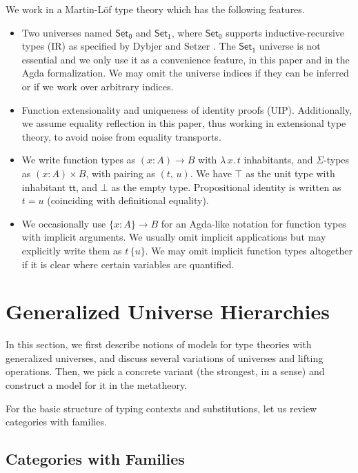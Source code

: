 \documentclass[a4paper,UKenglish,cleveref, autoref, thm-restate]{lipics-v2021}
\theoremstyle{remark}
\theoremstyle{definition}
\newcommand{\Set}[1]{\mathsf{Set_{#1}}}
\renewcommand{\tt}{\mathsf{tt}}
\begin{document}
We work in a Martin-Löf type theory which has the following features.
\begin{itemize}
  \item Two universes named $\Set0$ and $\Set1$, where $\Set0$ supports
    inductive-recursive types (IR) as specified by Dybjer and Setzer
    \cite{dybjer99finite}. The $\Set1$ universe is not essential and we only use
    it as a convenience feature, in this paper and in the Agda formalization. We
    may omit the universe indices if they can be inferred or if we work over
    arbitrary indices.
  \item Function extensionality and uniqueness of identity proofs
    (UIP). Additionally, we assume equality reflection in this paper, thus
    working in extensional type theory, to avoid noise from equality transports.
  \item We write function types as $(x : A)\to B$ with $\lambda\,x.\,t$
    inhabitants, and $\Sigma$-types as $(x : A) \times B$, with pairing as
    $(t,\, u)$. We have $\top$ as the unit type with inhabitant $\tt$, and
    $\bot$ as the empty type. Propositional identity is written as $t = u$
    (coinciding with definitional equality).
  \item We occasionally use $\{x : A\} \to B$ for an Agda-like notation for
    function types with implicit arguments. We usually omit implicit
    applications but may explicitly write them as $t\,\{u\}$.  We may omit
    implicit function types altogether if it is clear where certain variables
    are quantified.
\end{itemize}

\section{Generalized Universe Hierarchies}
\label{sec:ttgu}

In this section, we first describe notions of models for type theories with
generalized universes, and discuss several variations of universes and lifting
operations. Then, we pick a concrete variant (the strongest, in a sense)
and construct a model for it in the metatheory.

For the basic structure of typing contexts and substitutions, let us review
categories with families.

\subsection{Categories with Families}
\label{sec:categories_with_families}
\end{document}
